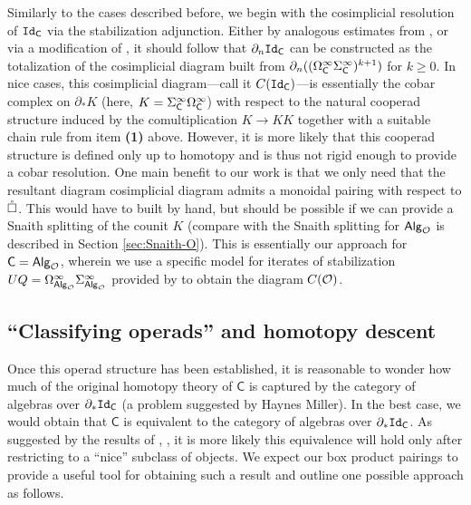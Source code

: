 Similarly to the cases described before, we begin with the cosimplicial resolution of $\mathtt{Id}_{\mathsf{C}}$ via the stabilization adjunction. Either by analogous estimates from \cite{BH}, \cite{Blom} or via a modification of \cite[16.1]{AC-1}, it should follow that $\partial_n \mathtt{Id}_{\mathsf{C}}$ can be constructed as the totalization of the cosimplicial diagram built from $\partial_n ((\Omega^{\infty}_{\mathsf{C}} \Sigma^{\infty}_{\mathsf{C}})^{k+1})$ for $k\geq 0$. In nice cases, this cosimplicial diagram---call it $C(\mathtt{Id}_{\mathsf{C}})$---is essentially the cobar complex on $\partial_* K$ (here, $K=\Sigma^{\infty}_{\mathsf{C}}\Omega^{\infty}_{\mathsf{C}}$) with respect to the natural cooperad structure induced by the comultiplication $K\to KK$ together with a suitable chain rule from item \textbf{(1)} above. However, it is more likely that this cooperad structure is defined only up to homotopy and is thus not rigid enough to provide a cobar resolution.
One main benefit to our work is that we only need that the resultant diagram cosimplicial diagram admits a monoidal pairing with respect to $\mathring{\square}$. This would have to built by hand, but should be possible if we can provide a Snaith splitting of the counit $K$ (compare with the Snaith splitting for ${\mathsf{Alg}_{\mathcal{O}}}$ is described in Section \ref{sec:Snaith-O}). This is essentially our approach for $\mathsf{C}={\mathsf{Alg}_{\mathcal{O}}}$, wherein we use a specific model for iterates of stabilization $UQ=\Omega^{\infty}_{{\mathsf{Alg}_{\mathcal{O}}}}\Sigma^{\infty}_{{\mathsf{Alg}_{\mathcal{O}}}}$ provided by \cite{KuhPer} to obtain the diagram $C(\mathcal{O})$.


\subsection*{``Classifying operads'' and homotopy descent} Once this operad structure has been established, it is reasonable to wonder how much of the original homotopy theory of $\mathsf{C}$ is captured by the category of algebras over $\partial_* \mathtt{Id}_{\mathsf{C}}$ (a problem suggested by Haynes Miller). In the best case, we would obtain that $\mathsf{C}$ is equivalent to the category of algebras over $\partial_* \mathtt{Id}_{\mathsf{C}}$. As suggested by the results of \cite{BH}, \cite{Ching-Harper-Koszul}, it is more likely this equivalence will hold only after restricting to a ``nice'' subclass of objects. 
We expect our box product pairings to provide a useful tool for obtaining such a result and outline one possible approach as follows. 

